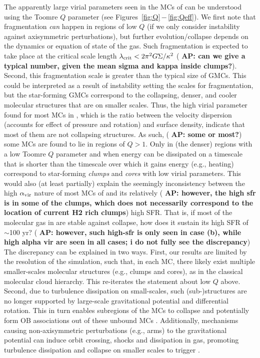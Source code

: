 \IfFileExists{emulateapjlegacy.cls}{\documentclass[iop]{emulateapjlegacy}}{\documentclass[iop]{emulateapj}}
\newcommand{\AP}[1]{({\bf \color{apcolor} AP: #1})}
\begin{document}
The apparently large virial parameters seen in the MCs of \flower can be understood using the Toomre $Q$ parameter (see Figures~\ref{fig:Q}\,$-$\,\ref{fig:Qeff}). We first note that fragmentation {\it can} happen in regions of low $Q$ (if we only consider instability against axisymmetric perturbations), but further evolution/collapse depends on the dynamics or equation of state of the gas.
%
Such fragmentation is expected to take place at the critical scale length $\lambda_{\rm crit} < 2 \pi^2 G \Sigma / \kappa^2$ \AP{can we give a typical number, given the mean sigma and kappa inside clumps?}. Second, this fragmentation scale is greater than the typical size of GMCs. This could be interpreted as a result of instability setting the scales for fragmentation, but the star-forming GMCs correspond to the collapsing, denser, and cooler molecular structures that are on smaller scales. 
%
Thus, the high virial parameter found for most MCs in \flower, which is the ratio between the velocity dispersion (accounts for effect of pressure and rotation) and surface density, indicate that most of them are not collapsing structures. As such, \AP{some or most?} some MCs are found to lie in regions of $Q>1$. 
Only in (the denser) regions with a low Toomre $Q$ parameter and when energy can be dissipated on a timescale that is shorter than the timescale over which it gains energy (e.g., heating) correspond to star-forming {\it clumps} and {\it cores} with low virial parameters.
%
This would also (at least partially) explain the seemingly inconsistency between the high $\alpha_{\rm vir}$ nature of most MCs of \flower and its relatively \AP{however, the high sfr is in some of the clumps, which does not necessarily correspond to the location of current H2 rich clumps} high SFR. That is, if most of the molecular gas in \flower are stable against collapse, how does it sustain its high SFR of $\sim$100\,\Msun\,yr\pmOne?
%
\AP{however, such high-sfr is only seen in case (b), while high alpha vir are seen in all cases; i do not fully see the discrepancy} The discrepancy can be explained in two ways. First, our results are limited by the resolution of the simulation, such that, in each MC, there likely exist multiple smaller-scales molecular structures (e.g., clumps and cores),
as in the classical molecular cloud hierarchy. This re-iterates the statement about low $Q$ above.
%
Second, due to turbulence dissipation on small-scales, such (sub-)structures are no longer supported by large-scale gravitational potential and differential rotation. This in turn enables subregions of the MCs to collapse and potentially form OB associations out of these unbound MCs \citep{Clark04a, Clark05a}.
%
Additionally, mechanisms causing non-axisymmetric perturbations (e.g., arms) to the gravitational potential can induce orbit crossing, shocks and dissipation in gas, promoting turbulence dissipation and collapse on smaller scales to trigger \SF.
\end{document}
